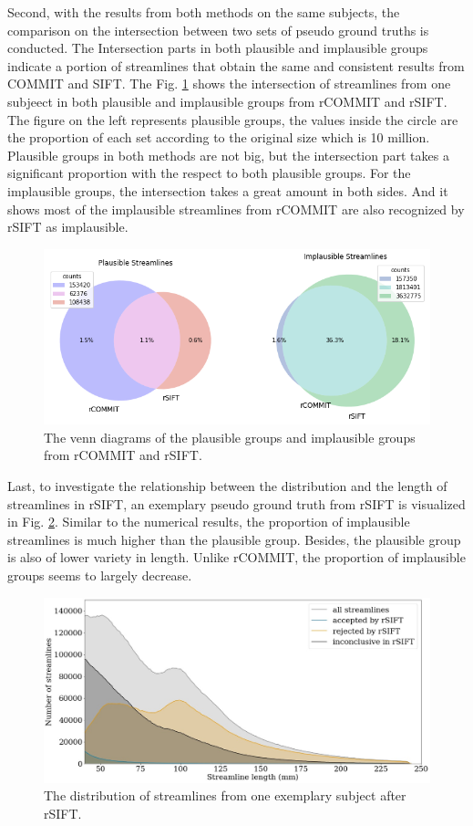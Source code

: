 Second, with the results from both methods on the same subjects, the comparison on the intersection between two sets of pseudo ground truths
is conducted. The Intersection parts in both plausible and implausible groups indicate a portion of streamlines that obtain the 
same and consistent results from COMMIT and SIFT. The Fig. \ref*{fig:com_s_c} shows the intersection of streamlines from one subjeect in both plausible 
and implausible groups from rCOMMIT and rSIFT. 
The figure on the left represents plausible groups, the values inside the circle are the proportion of each set
according to the original size which is 10 million. Plausible groups in both methods are not big, but the intersection part
takes a significant proportion with the respect to both plausible groups. For the implausible groups, the intersection takes a great amount in both sides. 
And it shows most of the implausible streamlines from rCOMMIT are also recognized by rSIFT as implausible.


\begin{figure}[ht]
    \centering
    \includegraphics[width= 12cm]{figures/comp_s_c.png}
        \caption{The venn diagrams of the plausible groups and implausible groups from rCOMMIT and rSIFT.}
    \label{fig:com_s_c}
\end{figure}

Last, to investigate the relationship between the distribution and the length of streamlines in rSIFT, an exemplary 
pseudo ground truth from rSIFT is visualized in Fig. \ref*{fig:threegroup_sift}. Similar to the numerical results,
the proportion of implausible streamlines is much higher than the plausible group. Besides, the plausible group is also of lower variety in length.
Unlike rCOMMIT, the proportion of implausible groups seems to largely decrease.

\begin{figure}[ht]
    \includegraphics[width= 12cm]{figures/distribution_sift.png}
    \caption{The distribution of streamlines from one exemplary subject after rSIFT. }
\label{fig:threegroup_sift}
\end{figure}


